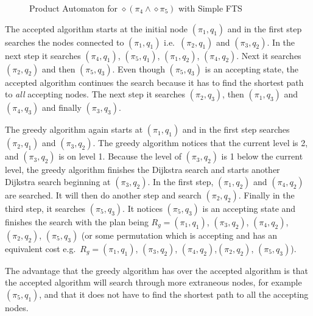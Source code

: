 \begin{figure}
\caption{Product Automaton for $\diamond (\pi_4 \wedge \diamond \pi_5)$ with Simple FTS}
\label{fig:Sequencing}
\end{figure}

The accepted algorithm starts at the initial node $(\pi_1,q_1)$ and in the first step searches the nodes connected to $(\pi_1,q_1)$ i.e.\ $(\pi_2,q_1)$ and $(\pi_3,q_2)$. In the next step it searches $(\pi_4,q_1)$, $(\pi_5,q_1)$, $(\pi_1,q_2)$, $(\pi_4,q_2)$. Next it searches $(\pi_2,q_2)$ and then $(\pi_5,q_3)$. Even though $(\pi_5,q_3)$ is an accepting state, the accepted algorithm continues the search because it has to find the shortest path to \textit{all} accepting nodes. The next step it searches $(\pi_2,q_3)$, then $(\pi_1,q_3)$ and $(\pi_4,q_3)$ and finally $(\pi_3,q_3)$.



The greedy algorithm again starts at $(\pi_1,q_1)$ and in the first step searches $(\pi_2,q_1)$ and $(\pi_3,q_2)$. The greedy algorithm notices that the current level is 2, and $(\pi_3,q_2)$ is on level 1. Because the level of $(\pi_3,q_2)$ is 1 below the current level, the greedy algorithm finishes the Dijkstra search and starts another Dijkstra search beginning at $(\pi_3,q_2)$. In the first step, $(\pi_1,q_2)$ and $(\pi_4,q_2)$ are searched. It will then do another step and search $(\pi_2,q_2)$. Finally in the third step, it searches $(\pi_5,q_3)$. It notices $(\pi_5,q_3)$ is an accepting state and finishes the search with the plan being $R_{g} = (\pi_1,q_1)$, $(\pi_3,q_2)$, $(\pi_4,q_2)$,$(\pi_2,q_2)$, $(\pi_5,q_3)$ (or some permutation which is accepting and has an equivalent cost e.g.\ $R_{g}=(\pi_1,q_1)$, $(\pi_3,q_2)$, $(\pi_4,q_2)$,$(\pi_2,q_2)$, $(\pi_5,q_3)$). 

The advantage that the greedy algorithm has over the accepted algorithm is that the accepted algorithm will search through more extraneous nodes, for example $(\pi_5,q_1)$, and that it does not have to find the shortest path to all the accepting nodes. %

